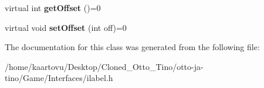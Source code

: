 \begin{DoxyCompactItemize}
\item 
\hypertarget{class_student_1_1i_label_a8c60b42e8e7ace00980822f04e573a41}{virtual int {\bfseries get\-Offset} ()=0}\label{class_student_1_1i_label_a8c60b42e8e7ace00980822f04e573a41}

\item 
\hypertarget{class_student_1_1i_label_a9daab876fcba4c6953c62fe1cf94e308}{virtual void {\bfseries set\-Offset} (int off)=0}\label{class_student_1_1i_label_a9daab876fcba4c6953c62fe1cf94e308}

\end{DoxyCompactItemize}


The documentation for this class was generated from the following file\-:\begin{DoxyCompactItemize}
\item 
/home/kaartovu/\-Desktop/\-Cloned\-\_\-\-Otto\-\_\-\-Tino/otto-\/ja-\/tino/\-Game/\-Interfaces/ilabel.\-h\end{DoxyCompactItemize}
